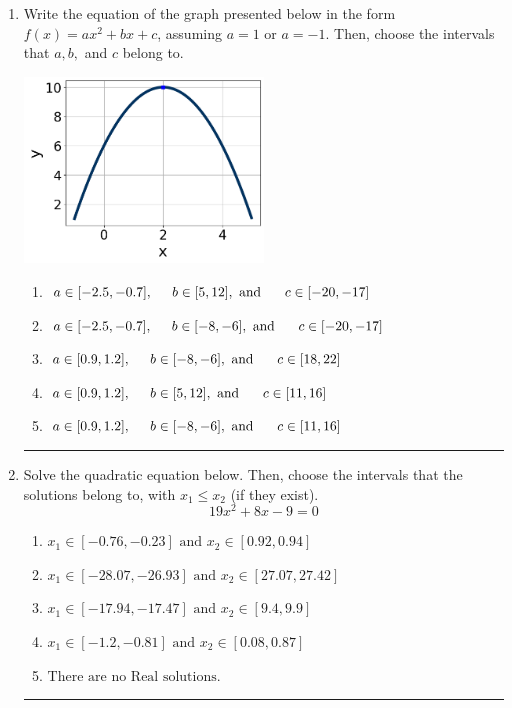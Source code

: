\documentclass[14pt]{extbook}
\newcommand{\litem}[1]{\item#1\hspace*{-1cm}\rule{\textwidth}{0.4pt}}
\begin{document}
\begin{enumerate}
{\begin{enumerate}[label=\Alph*.]
\end{enumerate} }
\litem{
Write the equation of the graph presented below in the form $f(x)=ax^2+bx+c$, assuming  $a=1$ or $a=-1$. Then, choose the intervals that $a, b,$ and $c$ belong to.
\begin{center}
    \includegraphics[width=0.5\textwidth]{../Figures/quadraticGraphToEquationCopyC.png}
\end{center}
\begin{enumerate}[label=\Alph*.]
\item \( a \in [-2.5, -0.7], \hspace*{5mm} b \in [5, 12], \text{ and } \hspace*{5mm} c \in [-20, -17] \)
\item \( a \in [-2.5, -0.7], \hspace*{5mm} b \in [-8, -6], \text{ and } \hspace*{5mm} c \in [-20, -17] \)
\item \( a \in [0.9, 1.2], \hspace*{5mm} b \in [-8, -6], \text{ and } \hspace*{5mm} c \in [18, 22] \)
\item \( a \in [0.9, 1.2], \hspace*{5mm} b \in [5, 12], \text{ and } \hspace*{5mm} c \in [11, 16] \)
\item \( a \in [0.9, 1.2], \hspace*{5mm} b \in [-8, -6], \text{ and } \hspace*{5mm} c \in [11, 16] \)

\end{enumerate} }
\litem{
Solve the quadratic equation below. Then, choose the intervals that the solutions belong to, with $x_1 \leq x_2$ (if they exist).\[ 19x^{2} +8 x -9 = 0 \]\begin{enumerate}[label=\Alph*.]
\item \( x_1 \in [-0.76, -0.23] \text{ and } x_2 \in [0.92, 0.94] \)
\item \( x_1 \in [-28.07, -26.93] \text{ and } x_2 \in [27.07, 27.42] \)
\item \( x_1 \in [-17.94, -17.47] \text{ and } x_2 \in [9.4, 9.9] \)
\item \( x_1 \in [-1.2, -0.81] \text{ and } x_2 \in [0.08, 0.87] \)
\item \( \text{There are no Real solutions.} \)


\end{enumerate}}
\end{enumerate}
\end{document}
